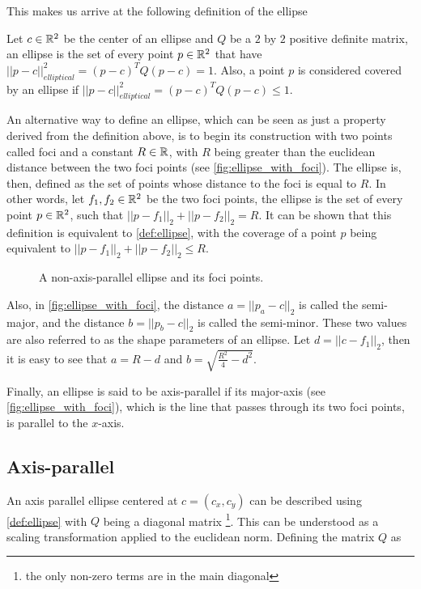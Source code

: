 This makes us arrive at the following definition of the ellipse

\begin{definicao}\label{def:ellipse}
    Let $c\in \mathbb{R}^2$ be the center of an ellipse and $Q$ be a $2$ by $2$ positive definite matrix, an ellipse is the set of every point $p \in \mathbb{R}^2$ that have $||p-c||_{elliptical}^2 = (p-c)^{T}Q(p-c) = 1$. Also, a point $p$ is considered covered by an ellipse if $||p-c||_{elliptical}^2 = (p-c)^{T}Q(p-c) \le 1$.
\end{definicao}

An alternative way to define an ellipse, which can be seen as just a property derived from the definition above, is to begin its construction with two points called foci and a constant $R \in \mathbb{R}$, with $R$ being greater than the euclidean distance between the two foci points (see \autoref{fig:ellipse_with_foci}). The ellipse is, then, defined as the set of points whose distance to the foci is equal to $R$. In other words, let $f_1, f_2 \in \mathbb{R}^2$ be the two foci points, the ellipse is the set of every point $p \in \mathbb{R}^2$, such that $||p-f_1||_2 + ||p-f_2||_2 = R$. It can be shown that this definition is equivalent to \autoref{def:ellipse}, with the coverage of a point $p$ being equivalent to $||p-f_1||_2 + ||p-f_2||_2 \le R$.

\begin{figure}[H]
    \centering
    
    \caption{A non-axis-parallel ellipse and its foci points.}
    
    \fautor
    \label{fig:ellipse_with_foci}
\end{figure}

Also, in \autoref{fig:ellipse_with_foci}, the distance $a = ||p_a - c||_2$ is called the semi-major, and the distance $b = ||p_b-c||_2$ is called the semi-minor. These two values are also referred to as the shape parameters of an ellipse. Let $d = ||c-f_1||_2$, then it is easy to see that $a = R - d$ and $b = \sqrt{\frac{R^2}{4} - d^2}$.

Finally, an ellipse is said to be axis-parallel if its major-axis (see \autoref{fig:ellipse_with_foci}), which is the line that passes through its two foci points, is parallel to the $x$-axis.

\subsection{Axis-parallel}

An axis parallel ellipse centered at $c = (c_x,c_y)$ can be described using \autoref{def:ellipse} with $Q$ being a diagonal matrix \footnote{the only non-zero terms are in the main diagonal}. This can be understood as a scaling transformation applied to the euclidean norm.
Defining the matrix $Q$ as

